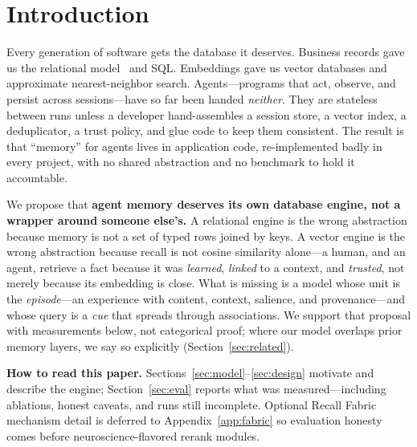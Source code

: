 \documentclass[11pt]{article}
\begin{document}
\section{Introduction}
Every generation of software gets the database it deserves. Business records gave
us the relational model~\cite{codd1970relational} and SQL. Embeddings gave us
vector databases and approximate nearest-neighbor search. Agents---programs that
act, observe, and persist across sessions---have so far been handed \emph{neither}.
They are stateless between runs unless a developer hand-assembles a session store,
a vector index, a deduplicator, a trust policy, and glue code to keep them
consistent. The result is that ``memory'' for agents lives in application code,
re-implemented badly in every project, with no shared abstraction and no
benchmark to hold it accountable.

We propose that \textbf{agent memory deserves its own database engine, not a
wrapper around someone else's.} A relational engine is the wrong abstraction because
memory is not a set of typed rows joined by keys. A vector engine is the wrong
abstraction because recall is not cosine similarity alone---a human, and an agent,
retrieve a fact because it was \emph{learned}, \emph{linked} to a context, and
\emph{trusted}, not merely because its embedding is close. What is missing is a
model whose unit is the \emph{episode}---an experience with content, context,
salience, and provenance---and whose query is a \emph{cue} that spreads through
associations. We support that proposal with measurements below, not categorical
proof; where our model overlaps prior memory layers, we say so explicitly
(Section~\ref{sec:related}).

\textbf{How to read this paper.} Sections~\ref{sec:model}--\ref{sec:design} motivate
and describe the engine; Section~\ref{sec:eval} reports what was measured---including
ablations, honest caveats, and runs still incomplete. Optional Recall Fabric
mechanism detail is deferred to Appendix~\ref{app:fabric} so evaluation honesty
comes before neuroscience-flavored rerank modules.
\end{document}
